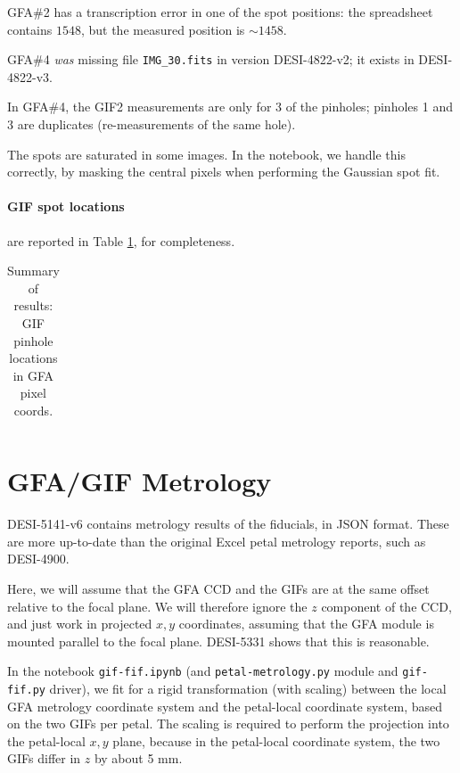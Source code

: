 \documentclass[10pt]{article}
\newcommand{\code}[1]{\texttt{#1}}
\begin{document}
GFA\#2 has a transcription error in one of the spot positions: the
spreadsheet contains $1548$, but the measured position is $\sim 1458$.

GFA\#4 \emph{was} missing file \code{IMG\_30.fits} in version
DESI-4822-v2; it exists in DESI-4822-v3.

In GFA\#4, the GIF2 measurements are only for 3 of the pinholes;
pinholes 1 and 3 are duplicates (re-measurements of the same hole).

The spots are saturated in some images.  In the notebook, we handle this correctly, by masking the central pixels
when performing the Gaussian spot fit.


\paragraph{GIF spot locations} are reported in Table \ref{tab:pinholes},
for completeness.

\begin{table}
  \begin{center}
    \begin{footnotesize}
    \begin{tabular}{|ccc|r|r|}
      \hline
      
    \end{tabular}
    \end{footnotesize}
  \end{center}
  \caption{Summary of results: GIF pinhole locations in GFA pixel coords.
  \label{tab:pinholes}}
\end{table}

\section{GFA/GIF Metrology}

DESI-5141-v6 contains metrology results of the fiducials, in JSON
format.  These are more up-to-date than the original Excel petal
metrology reports, such as DESI-4900.

Here, we will assume that the GFA CCD and the GIFs are at the same
offset relative to the focal plane.  We will therefore ignore the $z$
component of the CCD, and just work in projected $x,y$ coordinates,
assuming that the GFA module is mounted parallel to the focal plane.
DESI-5331 shows that this is reasonable.

In the notebook \code{gif-fif.ipynb} (and \code{petal-metrology.py}
module and \code{gif-fif.py} driver), we fit for a rigid
transformation (with scaling) between the local GFA metrology
coordinate system and the petal-local coordinate system, based on the
two GIFs per petal.  The scaling is required to perform the projection
into the petal-local $x,y$ plane, because in the petal-local
coordinate system, the two GIFs differ in $z$ by about 5 mm.
\end{document}
